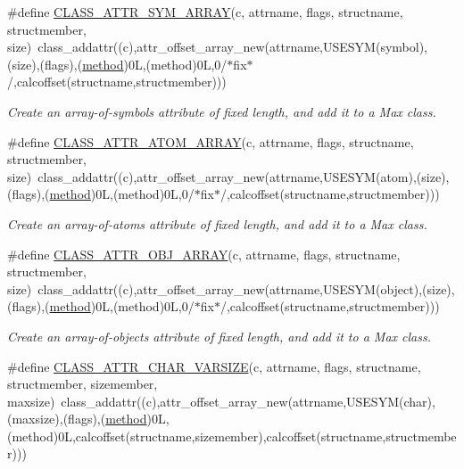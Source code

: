 \begin{DoxyCompactItemize}
\#define \hyperlink{group__attr_ga793a0a04f57f52eb60ad3d84c5d46b61}{CLASS\_\-ATTR\_\-SYM\_\-ARRAY}(c, attrname, flags, structname, structmember, size)~class\_\-addattr((c),attr\_\-offset\_\-array\_\-new(attrname,USESYM(symbol),(size),(flags),(\hyperlink{group__datatypes_gac26ba0a173b50597f5738132e059b42d}{method})0L,(method)0L,0/$\ast$fix$\ast$/,calcoffset(structname,structmember)))
\begin{DoxyCompactList}\small\item\em Create an array-\/of-\/symbols attribute of fixed length, and add it to a Max class. \item\end{DoxyCompactList}\item 
\#define \hyperlink{group__attr_gae1107e588b0d087305bcff2ebb91310b}{CLASS\_\-ATTR\_\-ATOM\_\-ARRAY}(c, attrname, flags, structname, structmember, size)~class\_\-addattr((c),attr\_\-offset\_\-array\_\-new(attrname,USESYM(atom),(size),(flags),(\hyperlink{group__datatypes_gac26ba0a173b50597f5738132e059b42d}{method})0L,(method)0L,0/$\ast$fix$\ast$/,calcoffset(structname,structmember)))
\begin{DoxyCompactList}\small\item\em Create an array-\/of-\/atoms attribute of fixed length, and add it to a Max class. \item\end{DoxyCompactList}\item 
\#define \hyperlink{group__attr_gac4ac2f09318920332814d5686ca914e0}{CLASS\_\-ATTR\_\-OBJ\_\-ARRAY}(c, attrname, flags, structname, structmember, size)~class\_\-addattr((c),attr\_\-offset\_\-array\_\-new(attrname,USESYM(object),(size),(flags),(\hyperlink{group__datatypes_gac26ba0a173b50597f5738132e059b42d}{method})0L,(method)0L,0/$\ast$fix$\ast$/,calcoffset(structname,structmember)))
\begin{DoxyCompactList}\small\item\em Create an array-\/of-\/objects attribute of fixed length, and add it to a Max class. \item\end{DoxyCompactList}\item 
\#define \hyperlink{group__attr_ga9729e0c9d3bab5d0f1160b3c2e5f2eab}{CLASS\_\-ATTR\_\-CHAR\_\-VARSIZE}(c, attrname, flags, structname, structmember, sizemember, maxsize)~class\_\-addattr((c),attr\_\-offset\_\-array\_\-new(attrname,USESYM(char),(maxsize),(flags),(\hyperlink{group__datatypes_gac26ba0a173b50597f5738132e059b42d}{method})0L,(method)0L,calcoffset(structname,sizemember),calcoffset(structname,structmember)))

\end{DoxyCompactItemize}
